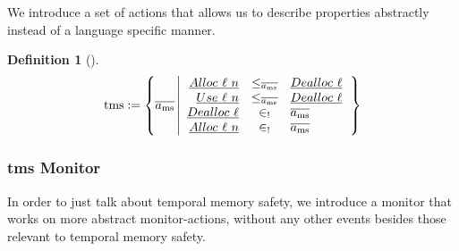 \documentclass[a4paper,names,dvipsnames]{article}
\newtheorem{definition}{Definition}
\begin{document}
We introduce a set of actions that allows us to describe properties abstractly instead of a language specific manner.



\begin{definition}[]\label{def:tms}\label{def:tempmemsafe}
  $$
  \text{tms}:=\left\{\trace[_{\mssafe}] \left| \begin{array}{rcl}
    \specificev{Alloc\ \loc\ n}&\le_{\trace[_{\mssafe}]}&\specificev{Dealloc\ \loc} \\
    \specificev{Use\ \loc\ n}&\le_{\trace[_{\mssafe}]}&\specificev{Dealloc\ \loc} \\
    \specificev{Dealloc\ \loc}&\in_{!}&\trace[_{\mssafe}] \\
    \specificev{Alloc\ \loc\ n}&\in_{!}&\trace[_{\mssafe}] \\
  \end{array}\right.\right\}
  $$
\end{definition}

\subsubsection{\gls*{tms} Monitor}
In order to just talk about temporal memory safety, we introduce a monitor that works on more abstract monitor-actions, without any other events besides those relevant to temporal memory safety.
\end{document}
